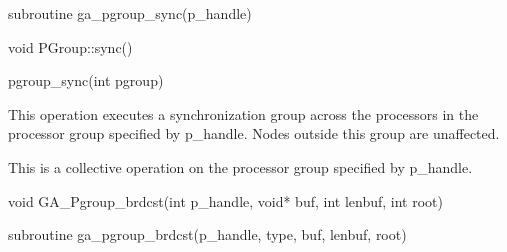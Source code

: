 \documentclass[12pt]{article}
\begin{document}
\begin{fapi}
\begin{fcode}
subroutine ga_pgroup_sync(p_handle)
\end{fcode}
\begin{funcargs}
\end{funcargs}
\end{fapi}

\begin{cxxapi}
\begin{cxxcode}
void PGroup::sync()
\end{cxxcode}
\end{cxxapi}

\begin{pyapi}
\begin{pycode}
pgroup_sync(int pgroup)
\end{pycode}
\end{pyapi}

\gcoll
\begin{desc}

This operation executes a synchronization group across the processors in the processor group specified by p_handle. Nodes outside this group are unaffected.

This is a collective operation on the processor group specified by p_handle.
\end{desc}


\begin{capi}
\begin{ccode}
void GA_Pgroup_brdcst(int p_handle, void* buf, int lenbuf, int root)
\end{ccode}
\begin{funcargs}
\end{funcargs}
\end{capi}

\begin{fapi}
\begin{fcode}
subroutine ga_pgroup_brdcst(p_handle, type, buf, lenbuf, root)
\end{fcode}
\begin{funcargs}
\end{funcargs}
\end{fapi}
\end{document}
